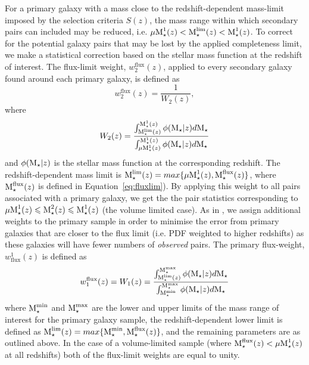 For a primary galaxy with a mass close to the redshift-dependent mass-limit imposed by the selection criteria $S(z)$, the mass range within which secondary pairs can included may be reduced, i.e.  $\mu\text{M}_{\star}^{1}(z) <  \text{M}_{\star}^{\rm{lim}}(z) < \text{M}_{\star}^{1}(z)$. To correct for the potential galaxy pairs that may be lost by the applied completeness limit, we make a statistical correction based on the stellar mass function at the redshift of interest. The flux-limit weight, $w^{\text{flux}}_{2}(z)$, applied to every secondary galaxy found around each primary galaxy, is defined as 
\begin{equation}
	w^{\text{flux}}_{2}(z) = \frac{1} {W_{2}(z)},	
\end{equation}
where 
\begin{equation}
	W_{2}(z) = \frac{ \int_{\text{M}_{\star}^{\text{lim}}(z)}^{\text{M}_{\star}^{\text{1}}(z)} 
								\phi(\text{M}_{\star}|z)d\text{M}_{\star}} 
								{ \int_{\mu \text{M}_{\star}^{1}(z)}^{\text{M}_{\star}^{\text{1}}(z)}
								\phi(\text{M}_{\star}|z)d\text{M}_{\star}}
\end{equation}
and \( \phi(\text{M}_{\star}|z) \) is the stellar mass function at the corresponding redshift. The redshift-dependent mass limit is \(\text{M}_{\star}^{\text{lim}}(z) = max \{ \mu \text{M}_{\star}^{1}(z), \text{M}_{\star}^{\rm{flux}}(z) \} \), where \(\text{M}_{\star}^{\rm{flux}}(z)\) is defined in Equation~\ref{eq:fluxlim}). By applying this weight to all pairs associated with a primary galaxy, we get the the pair statistics corresponding to $\mu \text{M}_{\star}^{1}(z) \leqslant \text{M}_{\star}^{\text{2}}(z) \leqslant \text{M}_{\star}^{\text{1}}(z)$ (the volume limited case). As in \citet{Patton:2000kt}, we assign additional weights to the primary sample in order to minimise the error from primary galaxies that are closer to the flux limit (i.e. PDF weighted to higher redshifts) as these galaxies will have fewer numbers of \emph{observed} pairs. The primary flux-weight, $w_{\text{flux}}^{1}(z)$ is defined as
\begin{equation}
	w^{\text{flux}}_{1}(z) =  W_{1}(z) = \frac{ \int_{\text{M}_{\star}^{\text{lim}}(z)}^{\text{M}_{\star}^{\rm{max}}} 
																	\phi(\text{M}_{\star}|z)d\text{M}_{\star}} { \int_{\text{M}_{\star}^{\rm{min}}}^{\text{M}_{\star}^{\rm{max}}}
																	\phi(\text{M}_{\star}|z)d\text{M}_{\star}}
\end{equation}
where $\text{M}_{\star}^{\rm{min}}$ and $\text{M}_{\star}^{\rm{max}}$ are the lower and upper limits of the mass range of interest for the primary galaxy sample, the redshift-dependent lower limit is defined as \( \text{M}_{\star}^{\text{lim}}(z) = max \{ \text{M}_{\star}^{\rm{min}}, \text{M}_{\star}^{\rm{flux}}(z) \} \), and the remaining parameters are as outlined above. In the case of a volume-limited sample (where \(\text{M}_{\star}^{\rm{flux}}(z) < \mu\text{M}_{\star}^{1}(z) \) at all redshifts) both of the flux-limit weights are equal to unity.

